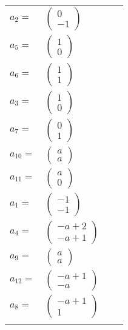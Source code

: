 \documentclass[1p]{elsarticle_modified}
\theoremstyle{definition}
\begin{document}
\begin{tabular}{m{7pt} m{180pt} m{7pt} m{180pt} }
\flushright $a_{2}=$&$\begin{pmatrix}0\\-1\end{pmatrix}$ \\
\flushright $a_{5}=$&$\begin{pmatrix}1\\0\end{pmatrix}$ \\
\flushright $a_{6}=$&$\begin{pmatrix}1\\1\end{pmatrix}$ \\
\flushright $a_{3}=$&$\begin{pmatrix}1\\0\end{pmatrix}$ \\
\flushright $a_{7}=$&$\begin{pmatrix}0\\1\end{pmatrix}$ \\
\flushright $a_{10}=$&$\begin{pmatrix}a\\a\end{pmatrix}$ \\
\flushright $a_{11}=$&$\begin{pmatrix}a\\0\end{pmatrix}$ \\
\flushright $a_{1}=$&$\begin{pmatrix}-1\\-1\end{pmatrix}$ \\
\flushright $a_{4}=$&$\begin{pmatrix}- a+2\\- a+1\end{pmatrix}$ \\
\flushright $a_{9}=$&$\begin{pmatrix}a\\a\end{pmatrix}$ \\
\flushright $a_{12}=$&$\begin{pmatrix}- a+1\\- a\end{pmatrix}$ \\
\flushright $a_{8}=$&$\begin{pmatrix}- a+1\\1\end{pmatrix}$\\&\end{tabular}
\end{document}
